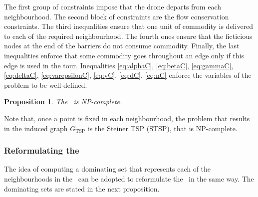 \documentclass[a4paper,  review, authoryear, 1p.]{elsarticle}
\newcommand{\SPPN}{{\sf{H-SPPN}\xspace }}
\newcommand{\TSPN}{{\sf{H-TSPN}\xspace }}
\newcommand{\GTSP}{{G_{\text{TSP}}}}
\newtheorem{prop}{Proposition}
\begin{document}
		The first group of constraints impose that the drone departs from each neighbourhood. The second block of constraints are the flow conservation constraints. The third inequalities ensure that one unit of commodity is delivered to each of the required neighbourhood. The fourth ones ensure that the ficticious nodes at the end of the barriers do not consume commodity. Finally, the last inequalities enforce that some commodity goes throughout an edge only if this edge is used in the tour. Inequalities \eqref{eq:alphaC}, \eqref{eq:betaC}, \eqref{eq:gammaC}, \eqref{eq:deltaC}, \eqref{eq:varepsilonC}, \eqref{eq:yC}, \eqref{eq:dC}, \eqref{eq:nC} enforce the variables of the problem to be well-defined.
		
		
		
		\begin{prop}
			The \TSPN \ is NP-complete.
		\end{prop}
		
		Note that, once a point is fixed in each neighbourhood, the problem that results in the induced graph $\GTSP$ is the Steiner TSP (STSP), that is NP-complete.
		
		
		\subsubsection{Reformulating the \TSPN}
		The idea of computing a dominating set that represents each of the neighbourhoods in the \SPPN \ can be adopted to reformulate the \TSPN \ in the same way. The dominating sets are stated in the next proposition.
		
\end{document}
